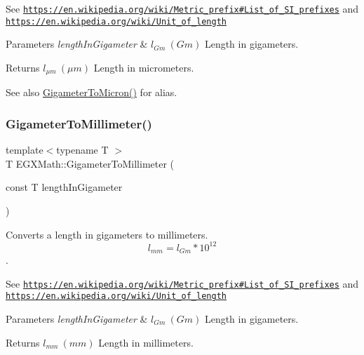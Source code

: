 See \href{https://en.wikipedia.org/wiki/Metric_prefix#List_of_SI_prefixes}{\tt https\+://en.\+wikipedia.\+org/wiki/\+Metric\+\_\+prefix\#\+List\+\_\+of\+\_\+\+S\+I\+\_\+prefixes} and \href{https://en.wikipedia.org/wiki/Unit_of_length}{\tt https\+://en.\+wikipedia.\+org/wiki/\+Unit\+\_\+of\+\_\+length} 
\begin{DoxyParams}{Parameters}
{\em length\+In\+Gigameter} & $ l_{Gm}\ (Gm)$ Length in gigameters. \\
\hline
\end{DoxyParams}
\begin{DoxyReturn}{Returns}
$ l_{\mu m}\ (\mu m)$ Length in micrometers. 
\end{DoxyReturn}
\begin{DoxySeeAlso}{See also}
\mbox{\hyperlink{group___e_g_x_math-_conversions-_length_conversions-_s_i-_gigameter-_non-_s_i_ga90426d22455e96b1f61e1850c7b89f77}{Gigameter\+To\+Micron()}} for alias. 
\end{DoxySeeAlso}
\mbox{\label{group___e_g_x_math-_conversions-_length_conversions-_s_i-_gigameter-_s_i_ga91b617f8bf6330f1379d3372e4968254}} 
\subsubsection{\texorpdfstring{Gigameter\+To\+Millimeter()}{GigameterToMillimeter()}}
{\footnotesize\ttfamily template$<$typename T $>$ \\
T E\+G\+X\+Math\+::\+Gigameter\+To\+Millimeter (\begin{DoxyParamCaption}\item[{const T}]{length\+In\+Gigameter }\end{DoxyParamCaption})}



Converts a length in gigameters to millimeters. \[ l_{mm}=l_{Gm} * 10^{12} \]. 

See \href{https://en.wikipedia.org/wiki/Metric_prefix#List_of_SI_prefixes}{\tt https\+://en.\+wikipedia.\+org/wiki/\+Metric\+\_\+prefix\#\+List\+\_\+of\+\_\+\+S\+I\+\_\+prefixes} and \href{https://en.wikipedia.org/wiki/Unit_of_length}{\tt https\+://en.\+wikipedia.\+org/wiki/\+Unit\+\_\+of\+\_\+length} 
\begin{DoxyParams}{Parameters}
{\em length\+In\+Gigameter} & $ l_{Gm}\ (Gm)$ Length in gigameters. \\
\hline
\end{DoxyParams}
\begin{DoxyReturn}{Returns}
$ l_{mm}\ (mm)$ Length in millimeters. 
\end{DoxyReturn}
\mbox{\label{group___e_g_x_math-_conversions-_length_conversions-_s_i-_gigameter-_s_i_ga6538a7007f104833aa7ad690156342b5}} 
